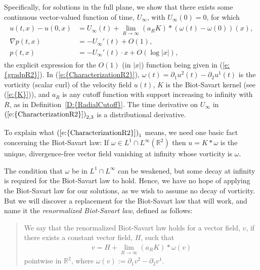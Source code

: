 \documentclass[reqno,openright,11pt,twoside]{amsart}
\theoremstyle{definition}
\numberwithin{equation}{section}
\begin{document}
Specifically, for solutions in the full plane, we show that there exists some continuous vector-valued function of time, $U_{\ensuremath{\infty}}$, with $U_{\ensuremath{\infty}}(0) = 0$, for which 
\begin{align}\label{e:CharacterizationR2}
	\begin{split}
		u(t, x) - u(0, x) &= U_{\ensuremath{\infty}}(t)
		    + \lim_{R \to {\ensuremath{\infty}}} (a_R K) * (\omega(t) - \omega(0))(x), \\
		{\ensuremath{\nabla}} p(t, x) &= - U_{\ensuremath{\infty}}'(t) + O(1), \\
		p(t, x) &= - U_{\ensuremath{\infty}}'(t) \cdot x + O(\log {\left\vert{x}\right\vert}),
	\end{split}
\end{align}
the explicit expression for the $O(1)$ (in ${\left\vert{x}\right\vert}$) function being given in {(\ref{e:{gradpR2}})}.
In {(\ref{e:{CharacterizationR2}})}, $\omega(t) = {\ensuremath{\partial}}_1 u^2(t) - {\ensuremath{\partial}}_2 u^1(t)$ is the vorticity (scalar curl) of the velocity field $u(t)$, $K$ is the Biot-Savart kernel (see {(\ref{e:{K}})}), and $a_R$ is any cutoff function with support increasing to infinity with $R$, as in {Definition~\ref{D:{RadialCutoff}}}. 
The time derivative on $U_{\ensuremath{\infty}}$ in ${(\ref{e:{CharacterizationR2}})}_{2, 3}$ is a distributional derivative.

To explain what ${(\ref{e:{CharacterizationR2}})}_1$ means, we need one basic fact concerning the Biot-Savart law: If $\omega \in L^1 \cap L^{\ensuremath{\infty}}({\ensuremath{{\ensuremath{\mathbb{{R}}}}}}^2)$ then
$
    u = K * \omega
$
is the unique, divergence-free vector field vanishing at infinity whose vorticity is $\omega$.

The condition that $\omega$ be in $L^1 \cap L^{\ensuremath{\infty}}$ can be weakened, but some decay at infinity is required for the Biot-Savart law to hold. Hence, we have no hope of applying the Biot-Savart law for our solutions, as we wish to assume no decay of vorticity. But we will discover a replacement for the Biot-Savart law that will work, and name it the \textit{renormalized Biot-Savart law}, defined as follows:
\begin{quote}
We say that the renormalized Biot-Savart law holds for a vector field, $v$, if there exists a constant vector field, $H$, such that
\begin{align}\label{e:RenBSLaw}
    v = H + \lim_{R \to {\ensuremath{\infty}}} (a_R K) * \omega(v)
\end{align}
pointwise in ${\ensuremath{{\ensuremath{\mathbb{{R}}}}}}^2$, where $\omega(v) := {\ensuremath{\partial}}_1 v^2 - {\ensuremath{\partial}}_2 v^1$.\end{quote}
\end{document}
